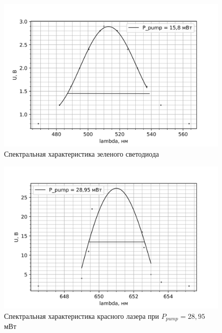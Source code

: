\documentclass[a4paper,12pt]{report}
\begin{document}
\begin{figure}[H]
	\centering
	\includegraphics[scale=0.7]{Green_phdiod_2.png}
	\caption{Спектральная характеристика зеленого светодиода}
        \label{pic.7}
\end{figure}

\begin{figure}[H]
	\centering
	\includegraphics[scale=0.7]{Red_lazer_2_P_pump = 28,95.png}
	\caption{Спектральная характеристика красного лазера при $P_{pump} = 28,95$ мВт}
        \label{pic.8}
\end{figure}
\end{document}
